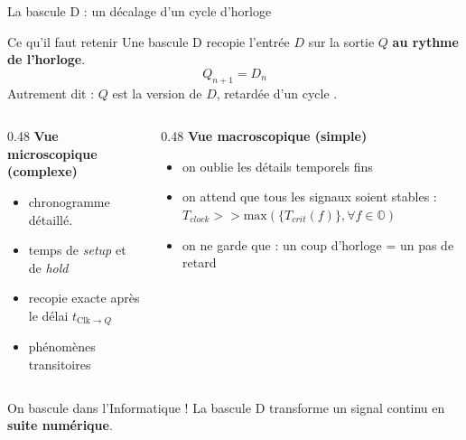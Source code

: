\begin{frame}{La bascule D : un décalage d’un cycle d’horloge}

  \begin{block}{Ce qu’il faut retenir}
    Une bascule D recopie l’entrée \(D\) sur la sortie \(Q\) \textbf{au rythme de l’horloge}.
    \[
      Q_{n+1} = D_n
    \]
    Autrement dit : \alert{\(Q\) est la version de \(D\), retardée d’un cycle }.
  \end{block}

  \vspace{0.1cm}

  \begin{columns}[T]
    \begin{column}{0.48\textwidth}
      \textbf{Vue microscopique (complexe)}
      \begin{itemize}
        \item chronogramme détaillé.
        \item temps de \emph{setup} et de \emph{hold}
        \item recopie exacte après le délai \(t_{\text{Clk}\to Q}\)
        \item phénomènes transitoires
      \end{itemize}

    \end{column}

    \begin{column}{0.48\textwidth}
      \textbf{Vue macroscopique (simple)}
      \begin{itemize}
        \item on oublie les détails temporels fins
        \item on attend que tous les signaux soient stables : $T_{clock} >> \text{max}(\{T_{crit}(f)\},\forall f \in \mathbb{O})$
        \item on ne garde que : \alert{un coup d’horloge = un pas de retard}
      \end{itemize}
    \end{column}
  \end{columns}

  \begin{alertblock}{On bascule dans l’Informatique !}
    La bascule D transforme un signal continu en \textbf{suite numérique}.
  \end{alertblock}
\end{frame}

